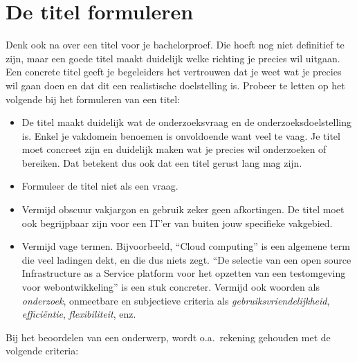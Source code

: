 \section{De titel formuleren}%
\label{sec:onderwerp_titel}

Denk ook na over een titel voor je bachelorproef. Die hoeft nog niet definitief te zijn, maar een goede titel maakt duidelijk welke richting je precies wil uitgaan. Een concrete titel geeft je begeleiders het vertrouwen dat je weet wat je precies wil gaan doen en dat dit een realistische doelstelling is. Probeer te letten op het volgende bij het formuleren van een titel:

\begin{itemize}
  \item De titel maakt duidelijk wat de onderzoeksvraag en de onderzoeksdoelstelling is. Enkel je vakdomein benoemen is onvoldoende want veel te vaag. Je titel moet concreet zijn en duidelijk maken wat je precies wil onderzoeken of bereiken. Dat betekent dus ook dat een titel gerust lang mag zijn.
  \item Formuleer de titel niet als een vraag.
  \item Vermijd obscuur vakjargon en gebruik zeker geen afkortingen. De titel moet ook begrijpbaar zijn voor een IT'er van buiten jouw specifieke vakgebied.
  \item Vermijd vage termen. Bijvoorbeeld, ``Cloud computing'' is een algemene term die veel ladingen dekt, en die dus niets zegt. ``De selectie van een open source Infrastructure as a Service platform voor het opzetten van een testomgeving voor webontwikkeling'' is een stuk concreter. Vermijd ook woorden als \emph{onderzoek}, onmeetbare en subjectieve criteria als \emph{gebruiksvriendelijkheid}, \emph{efficiëntie}, \emph{flexibiliteit}, enz.
\end{itemize}

Bij het beoordelen van een onderwerp, wordt o.a.\ rekening gehouden met de volgende criteria:

